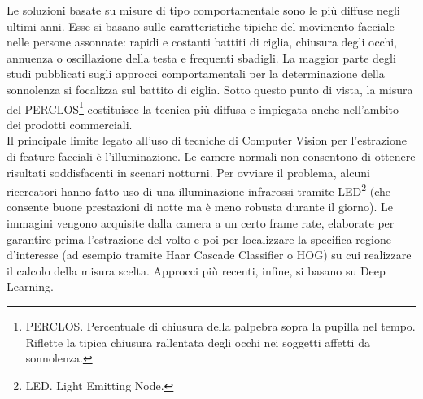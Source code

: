\documentclass[12pt]{article}
\begin{document}
Le soluzioni basate su misure di tipo comportamentale sono le più diffuse negli ultimi anni. Esse si basano sulle caratteristiche tipiche del movimento facciale nelle persone assonnate: rapidi e costanti battiti di ciglia, chiusura degli occhi, annuenza o oscillazione della testa e frequenti sbadigli. La maggior parte degli studi pubblicati sugli approcci comportamentali per la determinazione della sonnolenza si focalizza sul battito di ciglia. Sotto questo punto di vista, la misura del PERCLOS\footnote{PERCLOS. Percentuale di chiusura della palpebra sopra la pupilla nel tempo. Riflette la tipica chiusura rallentata degli occhi nei soggetti affetti da sonnolenza.} costituisce la tecnica più diffusa e impiegata anche nell'ambito dei prodotti commerciali.\\
Il principale limite legato all'uso di tecniche di Computer Vision per l'estrazione di feature facciali è l'illuminazione. Le camere normali non consentono di ottenere risultati soddisfacenti in scenari notturni. Per ovviare il problema, alcuni ricercatori hanno fatto uso di una illuminazione infrarossi tramite LED\footnote{LED. Light Emitting Node.}\cite{IEEE} (che consente buone prestazioni di notte ma è meno robusta durante il giorno). Le immagini vengono acquisite dalla camera a un certo frame rate, elaborate per garantire prima l'estrazione del volto e poi per localizzare la specifica regione d'interesse (ad esempio tramite Haar Cascade Classifier o HOG) su cui realizzare il calcolo della misura scelta. Approcci più recenti, infine, si basano su Deep Learning.
\end{document}

